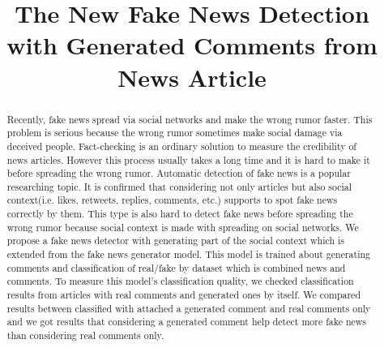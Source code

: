 \documentclass[conference]{IEEEtran}
\begin{document}
\title{The New Fake News Detection with Generated Comments from News Article%
}

\author{
\and
{}
\and
{}
\and
{}
}

\maketitle

\begin{abstract}
Recently, fake news spread via social networks and make the wrong rumor faster.
This problem is serious because the wrong rumor sometimes make social damage via deceived people.
Fact-checking is an ordinary solution to measure the credibility of news articles.
However this process usually takes a long time and it is hard to make it before spreading the wrong rumor.
Automatic detection of fake news is a popular researching topic.
It is confirmed that considering not only articles but also social context(i.e. likes, retweets, replies, comments, etc.) supports to spot fake news correctly by them.
This type is also hard to detect fake news before spreading the wrong rumor because social context is made with spreading on social networks.
We propose a fake news detector with generating part of the social context which is extended from the fake news generator model.
This model is trained about generating comments and classification of real/fake by dataset which is combined news and comments.
To measure this model's classification quality, we checked classification results from articles with real comments and generated ones by itself.
We compared results between classified with attached a generated comment and real comments only and we got results that considering a generated comment help detect more fake news than considering real comments only.
\end{abstract}
\end{document}
